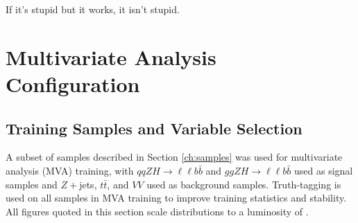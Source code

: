 \begin{savequote}[75mm]
If it's stupid but it works, it isn't stupid.
\end{savequote}

\chapter{Multivariate Analysis Configuration}
\label{ch:mva}
\section{Training Samples and Variable Selection}
A subset of samples described in Section \ref{ch:samples} was used for multivariate analysis (MVA) training, with $qqZH\to\ell\ell b\bar{b}$ and $ggZH\to\ell\ell b\bar{b}$ used as signal samples and $Z+$jets, $t\bar{t}$, and $VV$ used as background samples.  Truth-tagging is used on all samples in MVA training to improve training statistics and stability.  All figures quoted in this section scale distributions to a luminosity of \LUMI.

